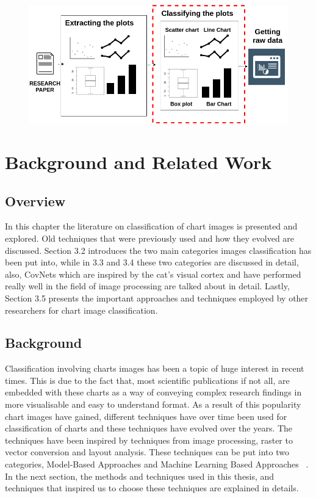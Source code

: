 \documentclass[12pt, a4paper,oneside]{report}
\begin{document}
\begin{figure}[!htb]
\includegraphics [scale=0.48] {vision}
\label{fig:vis}
\end{figure}


\chapter{Background and Related Work}



\section{Overview}
In this chapter the literature on classification of chart images is presented and explored. Old techniques that were previously used and how they evolved are discussed. Section 3.2 introduces the two main categories images classification has been put into, while in 3.3 and 3.4 these two categories are discussed in detail, also, CovNets which are inspired by the cat’s visual cortex and have performed really well in the field of image processing are talked about in detail. Lastly, Section 3.5 presents the important approaches and techniques employed by other researchers for chart image classification.


\section{Background}
Classification involving charts images has been a topic of huge interest in recent times. This is due to the fact that, most scientific publications if not all, are embedded with these charts as a way of conveying complex research findings in more visualisable and easy to understand format. As a result of this popularity chart images have gained, different techniques have over time been used for classification of charts and these techniques have evolved over the years. The techniques have been inspired by techniques from image processing, raster to vector conversion and layout analysis. These techniques can be put into two categories, Model-Based Approaches and Machine Learning Based Approaches ~\cite{amara2017convolutional}. In the next section, the methods and techniques used in this thesis, and techniques that inspired us to choose these techniques are explained in details.
\end{document}
